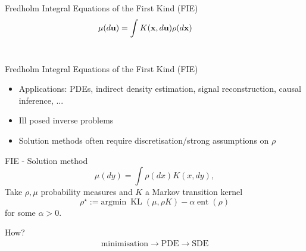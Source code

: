 \documentclass[aspectratio=149]{beamer}
\DeclareMathOperator{\KL}{KL}
\DeclareMathOperator{\ent}{ent}
\newcommand{\tikzmark}[1]{\tikz[overlay,remember picture] \node (#1) {};}
\begin{document}
\begin{frame}{Fredholm Integral Equations of the First Kind (FIE)}
\begin{equation*}
      \mu\tikzmark{a}(d\mathbf{u}) = \int K(\mathbf{x} \tikzmark{b},d\mathbf{u})\rho\tikzmark{c}(d\mathbf{x})\ \qquad
\end{equation*}\\[2ex]
\centering

\qquad 
{}
\qquad
\vskip 10pt
  
\end{frame}

\begin{frame}{Fredholm Integral Equations of the First Kind (FIE)}

\begin{itemize}
\item Applications: PDEs, indirect density estimation, signal reconstruction, causal inference, ...
\item Ill posed inverse problems
\item Solution methods often require discretisation/strong assumptions on $\rho$
\end{itemize}
\end{frame}

\begin{frame}{FIE - Solution method}
\begin{equation*}
\mu(dy) = \int \rho(dx) K(x,dy),
\end{equation*}
Take $\rho,\mu$ probability measures and $K$ a Markov transition kernel
\begin{equation*}
\rho^\star:= \text{argmin}\ \KL(\mu,\rho K)-\alpha\ent(\rho)
\end{equation*}
for some $\alpha>0$.
\pause

How?
\begin{align*}
\text{minimisation}\longrightarrow \text{PDE}\longrightarrow \text{SDE}
\end{align*}
\end{frame}
\end{document}
